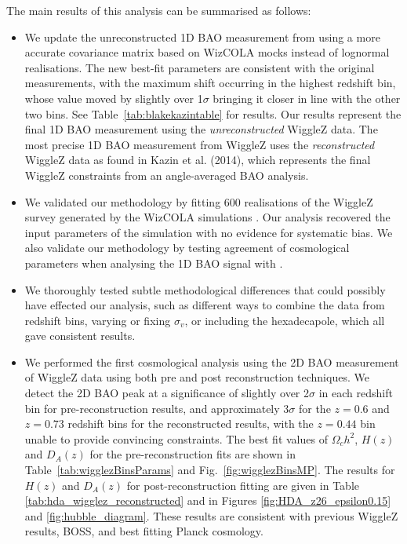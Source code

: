 \documentclass[a4paper,fleqn,usenatbib]{mnras}
\begin{document}
The main results of this analysis can be summarised as follows:
\begin{itemize}
	\item We update the unreconstructed 1D BAO measurement from \citet{BlakeKazin2011} using a more accurate covariance matrix based on WizCOLA mocks instead of lognormal realisations. The new best-fit parameters are consistent with the original measurements, with the maximum shift occurring in the highest redshift bin, whose value moved by slightly over 1$\sigma$ bringing it closer in line with the other two bins. See Table~\ref{tab:blakekazintable} for results.  Our results represent the final 1D BAO measurement using the {\em unreconstructed} WiggleZ data.  The most precise 1D BAO measurement from WiggleZ uses the {\em reconstructed} WiggleZ data as found in Kazin et al. (2014), which represents the final WiggleZ constraints from an angle-averaged BAO analysis.
	\item We validated our methodology by fitting 600 realisations of the WiggleZ survey generated by the WizCOLA simulations \citep{KodaBlake2015}. Our analysis recovered the input parameters of the simulation with no evidence for systematic bias. We also validate our methodology by testing agreement of cosmological parameters when analysing the 1D BAO signal with  \citet{BlakeKazin2011}.
	\item We thoroughly tested subtle methodological differences that could possibly have effected our analysis, such as different ways to combine the data from redshift bins, varying or fixing $\sigma_v$, or including the hexadecapole, which all gave consistent results.
	\item We performed the first cosmological analysis using the 2D BAO measurement of WiggleZ data using both pre and post reconstruction techniques. We detect the 2D BAO peak at a significance of slightly over 2$\sigma$ in each redshift bin for pre-reconstruction results, and approximately 3$\sigma$ for the $z=0.6$ and $z=0.73$ redshift bins for the reconstructed results, with the $z=0.44$ bin unable to provide convincing constraints. The best fit values of $\Omega_c h^2$, $H(z)$ and $D_A(z)$ for the pre-reconstruction fits are shown in Table~\ref{tab:wigglezBinsParams} and Fig.~\ref{fig:wigglezBinsMP}.  The results for $H(z)$ and $D_A(z)$ for post-reconstruction fitting are given in Table \ref{tab:hda_wigglez_reconstructed} and in Figures \ref{fig:HDA_z26_epsilon0.15} and \ref{fig:hubble_diagram}. These results are consistent with previous WiggleZ results, BOSS, and best fitting Planck cosmology.
\end{itemize}
\end{document}
